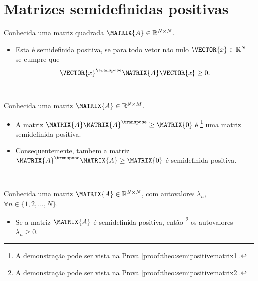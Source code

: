 \section{ Matrizes semidefinidas positivas}

\begin{definition}\label{def:semipositivematrix0}
Conhecida uma matriz quadrada $\MATRIX{A} \in \mathbb{R}^{N \times N}$. 
\begin{itemize}
\item Esta é semidefinida positiva, se para todo vetor não nulo $\VECTOR{x} \in \mathbb{R}^N$
se cumpre que \cite[pp. 159]{golub2013matrix} 
\begin{equation}
\VECTOR{x}^{\transpose} \MATRIX{A} \VECTOR{x} \geq 0.
\end{equation}
\end{itemize}
\end{definition}

~

\begin{theorem}\label{theo:semipositivematrix1}
Conhecida uma matriz $\MATRIX{A} \in \mathbb{R}^{N \times M}$.
\begin{itemize}
\item A matriz $\MATRIX{A}\MATRIX{A}^{\transpose} \geq \MATRIX{0}$ é
\footnote{A demonstração pode ser vista na Prova \ref{proof:theo:semipositivematrix1}.} 
uma matriz semidefinida positiva.
\item Consequentemente, tambem a matriz $\MATRIX{A}^{\transpose}\MATRIX{A}  \geq \MATRIX{0}$ é semidefinida positiva.
\end{itemize}
\end{theorem}

~

\begin{theorem}\label{theo:semipositivematrix2}
Conhecida uma matriz $\MATRIX{A} \in \mathbb{R}^{N \times N}$, com  autovalores $\lambda_n$,
$\forall n \in \{1, 2, ..., N\}$.
\begin{itemize}
\item Se a matriz $\MATRIX{A}$ é semidefinida positiva, então
\footnote{A demonstração pode ser vista na Prova \ref{proof:theo:semipositivematrix2}.} 
os autovalores $\lambda_n \geq 0$.
\end{itemize}
\end{theorem}
